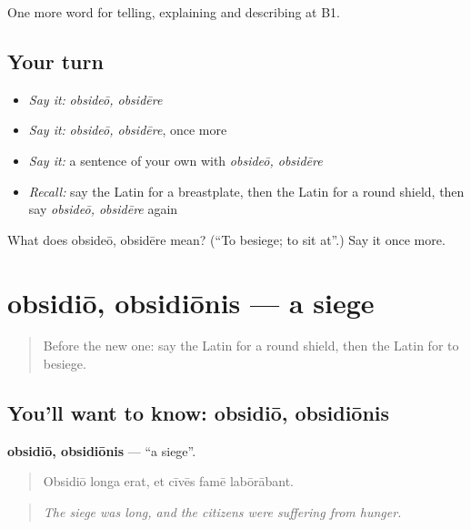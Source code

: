 \begin{grammarlens}[title={What you've built}]
One more word for telling, explaining and describing at B1.
\end{grammarlens}

\subsection*{Your turn}
\begin{itemize}
\raggedright
  \item \emph{Say it:} \emph{obsideō, obsidēre}
  \item \emph{Say it:} \emph{obsideō, obsidēre}, once more
  \item \emph{Say it:} a sentence of your own with \emph{obsideō, obsidēre}
  \item \emph{Recall:} say the Latin for a breastplate, then the Latin for a round shield, then say \emph{obsideō, obsidēre} again
\end{itemize}

\begin{tcolorbox}[breakable,colback=teal!4,colframe=teal!35!black,title={Before you move on}]
What does obsideō, obsidēre mean? (\textquotedblleft{}To besiege; to sit at\textquotedblright{}.) Say it once more.
\end{tcolorbox}
\section[obsidiō, obsidiōnis]{obsidiō, obsidiōnis — a siege}

\label{lesson:LA-C341-obsidio}



\begin{quote}
Before the new one: say the Latin for a round shield, then the Latin for to besiege.
\end{quote}

\subsection*{You'll want to know: obsidiō, obsidiōnis}
\textbf{obsidiō, obsidiōnis} — \textquotedblleft{}a siege\textquotedblright{}.

\begin{quote}
Obsidiō longa erat, et cīvēs famē labōrābant.
\end{quote}

\begin{quote}
\emph{The siege was long, and the citizens were suffering from hunger.}
\end{quote}

